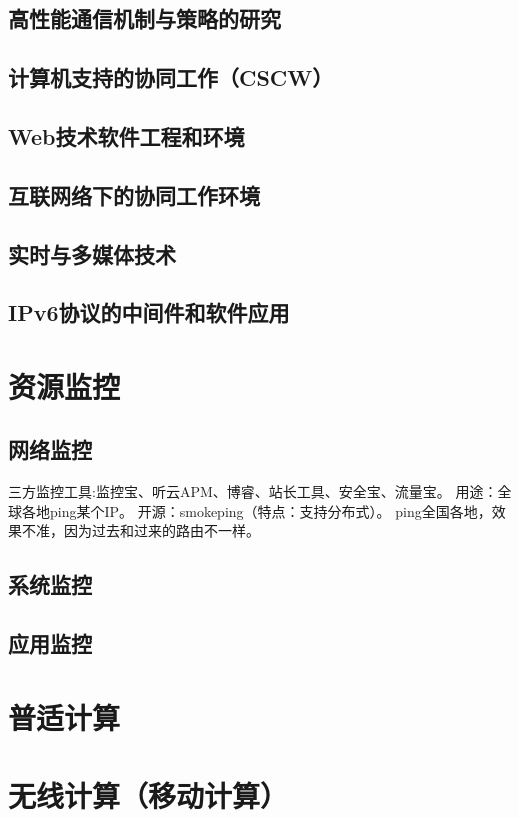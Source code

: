 \documentclass[UTF8]{../computerUniverse}
\begin{document}
\section{高性能通信机制与策略的研究}
\section{计算机支持的协同工作（CSCW）}
\section{Web技术软件工程和环境}
\section{互联网络下的协同工作环境}
\section{实时与多媒体技术}
\section{IPv6协议的中间件和软件应用}




\chapter{资源监控}

\section{网络监控}
三方监控工具:监控宝、听云APM、博睿、站长工具、安全宝、流量宝。
用途：全球各地ping某个IP。
开源：smokeping（特点：支持分布式）。
ping全国各地，效果不准，因为过去和过来的路由不一样。

\section{系统监控}
\section{应用监控}




\chapter{普适计算}
\chapter{无线计算（移动计算）}
\end{document}
